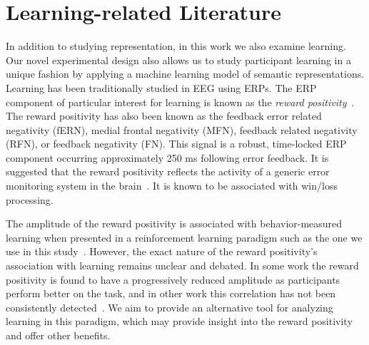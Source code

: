 \section{Learning-related Literature}

In addition to studying representation, in this work we also examine learning. 
Our novel experimental design also allows us to study participant learning in a 
unique fashion by applying a machine learning model of semantic 
representations. Learning has been traditionally studied in EEG using ERPs. The 
ERP component of particular interest for learning is known as the \emph{reward 
positivity}~\cite{proudfit2015reward}. The reward positivity has also been 
known as the feedback error related negativity (fERN), medial frontal 
negativity (MFN), feedback related negativity (RFN), or feedback negativity 
(FN). This signal is a robust, time-locked ERP component occurring 
approximately 250 ms following error feedback. It is suggested that the reward 
positivity reflects the activity of a generic error monitoring system in the 
brain~\cite{miltner1997event}. It is known to be associated with win/loss 
processing.

The amplitude of the reward positivity is associated with behavior-measured 
learning when presented in a reinforcement learning paradigm such as the one we 
use in this study~\cite{holroyd2002neural, sutton1998reinforcement, 
williams2017application}. However, the exact nature of the reward positivity's 
association with learning remains unclear and debated. In some work the reward 
positivity is found to have a progressively reduced amplitude as participants 
perform better on the task, and in other work this correlation has not been 
consistently detected~\cite{walsh2012learning}. We aim to provide an 
alternative tool for analyzing learning in this paradigm, which may provide 
insight into the reward positivity and offer other benefits.
